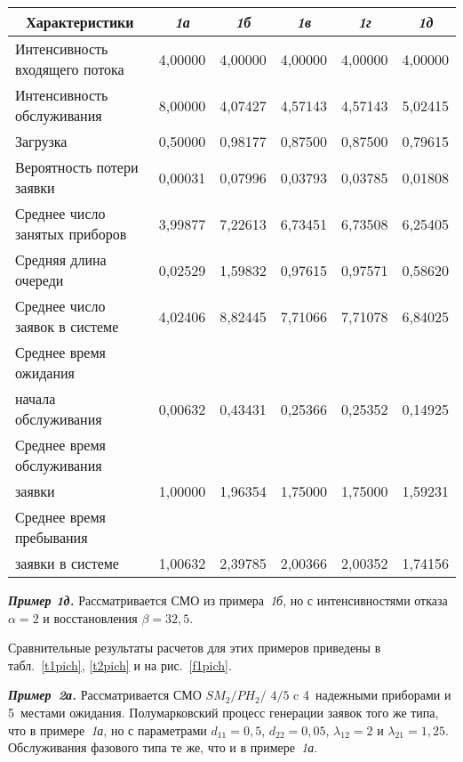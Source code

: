 \begin{multicols}{2}
\begin{table*}
\begin{center}
\begin{tabular}{|l|c|c|c|c|c|}
\hline \multicolumn{1}{|c|}{Характеристики}   & \textit{1а} & \textit{1б}   & 
\textit{1в}   & \textit{1г}
 & \textit{1д}   \\
\hline
Интенсивность входящего потока              & 4,00000 & 4,00000 & 4,00000 & 4,00000 & 4,00000 \\
\hline
Интенсивность обслуживания                  & 8,00000 & 4,07427 & 4,57143 & 4,57143 & 5,02415 \\
\hline
Загрузка                                    & 0,50000 & 0,98177 & 0,87500 & 0,87500 & 0,79615 \\
\hline
Вероятность потери заявки                   & 0,00031 & 0,07996 & 0,03793 & 0,03785 & 0,01808 \\
\hline
Среднее число занятых приборов              & 3,99877 & 7,22613 & 6,73451 & 6,73508 & 6,25405 \\
\hline
Средняя длина очереди                       & 0,02529 & 1,59832 & 0,97615 & 0,97571 & 0,58620 \\
\hline
Среднее число заявок в системе              & 4,02406 & 8,82445 & 7,71066 & 7,71078 & 6,84025 \\
\hline
Среднее время ожидания & & & & & \\
начала обслуживания                         & 0,00632 & 0,43431 & 0,25366 & 0,25352 & 0,14925 \\
\hline
Среднее время обслуживания && & & & \\
заявки                                      & 1,00000 & 1,96354 & 1,75000 & 1,75000 & 1,59231 \\
\hline
Среднее время пребывания & & && & \\
заявки в системе                            & 1,00632 & 2,39785 & 2,00366 & 2,00352 & 1,74156 \\
\hline
\end{tabular}
\end{center}
\end{table*}
{\bfseries\textit{Пример 1д.}} Рассматривается СМО из примера~\textit{1б}, но с 
интенсивностями отказа $\alpha = 2$ и восстановления $\beta= 32{,}5$.

Сравнительные результаты расчетов для этих примеров приведены в табл.~\ref{t1pich},
\ref{t2pich} и на рис.~\ref{f1pich}.


{\bfseries\textit{Пример~2а.}} Рассматривается СМО $SM_2/PH_2/$ $4/5$ c 
4~надежными приборами и 5~мес\-та\-ми ожидания. Полумарковский процесс 
генерации заявок того же типа, что в примере~\textit{1а}, но с параметрами 
$d_{11}=0{,}5$, $d_{22}=0{,}05$, $\lambda_{12}=2$ и $\lambda_{21}=1{,}25$. 
Обслуживания фазового типа те же, что и в примере~\textit{1а}.


\end{multicols}

